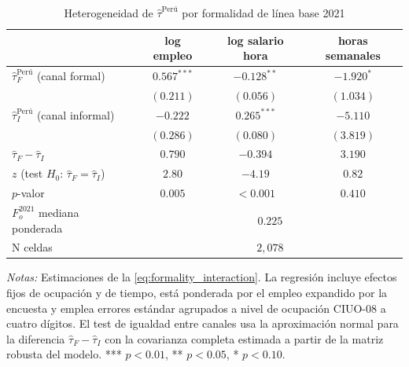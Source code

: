 \begin{table}[H]
\centering
\small
\begin{threeparttable}
\caption{Heterogeneidad de $\hat\tau^{\text{Per\'{u}}}$ por formalidad de l\'{i}nea base 2021}
\label{tab:peru_formality}
\begin{tabular}{l c c c}
\toprule
                                                & log empleo             & log salario hora        & horas semanales       \\
\midrule
$\hat\tau_F^{\text{Per\'{u}}}$ (canal formal)   & $\mathbf{0.567^{***}}$ & $\mathbf{-0.128^{**}}$  & $-1.920^{*}$          \\
                                                & $(0.211)$              & $(0.056)$               & $(1.034)$             \\
$\hat\tau_I^{\text{Per\'{u}}}$ (canal informal) & $-0.222$               & $\mathbf{0.265^{***}}$  & $-5.110$              \\
                                                & $(0.286)$              & $(0.080)$               & $(3.819)$             \\
\midrule
$\hat\tau_F - \hat\tau_I$                       & $0.790$                & $-0.394$                & $3.190$               \\
$z$ (test $H_0:\,\hat\tau_F = \hat\tau_I$)      & $2.80$                 & $-4.19$                 & $0.82$                \\
$p$-valor                                       & $\mathbf{0.005}$       & $\mathbf{<0.001}$        & $0.410$               \\
\midrule
$F_o^{2021}$ mediana ponderada                  & \multicolumn{3}{c}{$0.225$}                                              \\
N celdas                                        & \multicolumn{3}{c}{$2{,}078$}                                            \\
\bottomrule
\end{tabular}
\begin{tablenotes}[flushleft]
\footnotesize
\item \emph{Notas:} Estimaciones de la \cref{eq:formality_interaction}. La regresi\'{o}n incluye efectos fijos de ocupaci\'{o}n y de tiempo, est\'{a} ponderada por el empleo expandido por la encuesta y emplea errores est\'{a}ndar agrupados a nivel de ocupaci\'{o}n CIUO-08 a cuatro d\'{i}gitos. El test de igualdad entre canales usa la aproximaci\'{o}n normal para la diferencia $\hat\tau_F - \hat\tau_I$ con la covarianza completa estimada a partir de la matriz robusta del modelo. *** $p<0.01$, ** $p<0.05$, * $p<0.10$.
\end{tablenotes}
\end{threeparttable}
\end{table}

